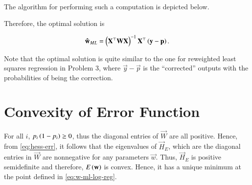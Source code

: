 \documentclass[journal,12pt,twocolumn]{IEEEtran}
\begin{document}
The algorithm for performing such a computation is depicted below.

Therefore, the optimal solution is

\begin{equation}
     \boldsymbol{\mathbf{\hat{w}}}_{ML} = \left(\boldsymbol{\mathbf{X}}^\top\boldsymbol{\mathbf{WX}}\right)^{-1}\boldsymbol{\mathbf{X}}^\top\left(\boldsymbol{\mathbf{y}}-\boldsymbol{\mathbf{p}}\right).
     \label{eq:w-ml-log-reg}
\end{equation}

Note that the optimal solution is quite similar to the one for reweighted least
squares regression in Problem 3, where \(\vec{y}-\vec{p}\) is the ``corrected''
outputs with the probabilities of being the correction.

\section{Convexity of Error Function}

For all \(i\), \(p_i\left(1-p_i\right) \ge 0\), thus the diagonal entries of
\(\vec{W}\) are all positive. Hence, from \eqref{eq:hess-err}, it follows that
the eigenvalues of \(\vec{H}_E\), which are the diagonal entries in \(\vec{W}\)
are nonnegative for any parameters \(\vec{w}\). Thus, \(\vec{H}_E\) is positive
semidefinite and therefore, \(E\left(\boldsymbol{\mathbf{w}}\right)\) is convex. Hence, it has a
unique minimum at the point defined in \eqref{eq:w-ml-log-reg}.
\end{document}
